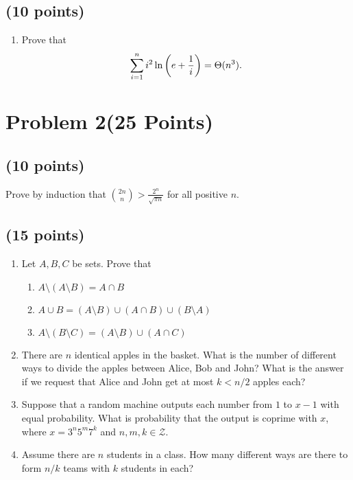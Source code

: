 \documentclass[letterpaper, 11pt]{article}
\begin{document}
\subsection{(10 points)}

\begin{enumerate}

\item Prove that $$\sum_{i=1}^n i^2\ln\left(e + {1\over i}\right)  = \Theta(n^3).$$

\end{enumerate}

\section{Problem 2(25 Points)}

\subsection{(10 points)}

Prove by induction that ${2n \choose n} > \frac{2^n}{{\sqrt{\pi n}}}$ for all positive $n$.

\subsection{(15 points)}

\begin{enumerate}

\item Let $A,B,C$ be sets. Prove that 
\begin{enumerate}
\item$A\setminus (A \setminus B) = A \cap B$
\item$A \cup B = (A \setminus B) \cup (A \cap B) \cup (B \setminus A)$
\item$A \setminus (B \setminus C) = (A \setminus B) \cup (A \cap C)$
\end{enumerate}

\item There are $n$ identical apples in the basket. What is the number of different ways to divide the apples between Alice, Bob and John?
What is the answer if we request that Alice and John get at most $k < n/2$ apples each?


\item Suppose that a random machine outputs each number from $1$ to $x-1$ with equal probability. What is probability that the output is coprime with $x$, where $x = 3^n5^m7^k$ and $n,m,k \in \mathcal Z$. 

\item Assume there are $n$ students in a class. How many different ways are there to form $n/k$ teams with $k$ students in each?

\end{enumerate}
\end{document}
